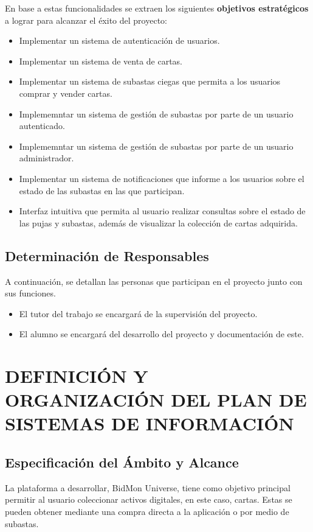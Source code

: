 En base a estas funcionalidades se extraen los siguientes \textbf{objetivos estratégicos} a lograr para alcanzar el éxito del proyecto:

\begin{itemize}
    \item Implementar un sistema de autenticación de usuarios.
    \item Implementar un sistema de venta de cartas.
    \item Implementar un sistema de subastas ciegas que permita a los usuarios comprar y vender cartas.
    \item Implememntar un sistema de gestión de subastas por parte de un usuario autenticado.
    \item Implememntar un sistema de gestión de subastas por parte de un usuario administrador.
    \item Implementar un sistema de notificaciones que informe a los usuarios sobre el estado de las subastas en las que participan.
    \item Interfaz intuitiva que permita al usuario realizar consultas sobre el estado de las pujas y subastas, además de visualizar la colección de cartas adquirida.
\end{itemize}

\subsection{Determinación de Responsables}
A continuación, se detallan las personas que participan en el proyecto junto con sus funciones.
\begin{itemize}
    \item El tutor del trabajo se encargará de la supervisión del proyecto.
    \item El alumno se encargará del desarrollo del proyecto y documentación de este. 
\end{itemize}

\newpage
\section{DEFINICIÓN Y ORGANIZACIÓN DEL PLAN DE SISTEMAS DE INFORMACIÓN}
 

\subsection{Especificación del Ámbito y Alcance} 
La plataforma a desarrollar, BidMon Universe, tiene como objetivo principal permitir al usuario coleccionar activos digitales, en este caso, cartas. 
Estas se pueden obtener mediante una compra directa a la aplicación o por medio de subastas.

